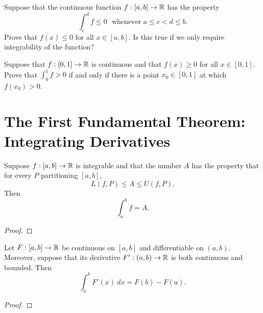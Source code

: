 \documentclass[letterpaper, twoside, 12pt]{book}
\begin{document}
\begin{exercise}[5]
  Suppose that the continuous function \(f:[a,b]\to\mathbb R\) has the property
  \[
    \int_c^d f\leq 0
      \text{~~whenever~}
    a\leq c<d\leq b
  .\]
  Prove that \(f(x)\leq 0\) for all \(x\in[a,b]\). Is this true if we only
  require integrability of the function?
\end{exercise}
\begin{solution}

\end{solution}


\begin{exercise}[6]
  Suppose that \(f:[0,1]\to\mathbb R\) is continuous and that \(f(x)\geq 0\) for
  all \(x\in[0,1]\). Prove that \(\int_0^1 f>0\) if and only if there is a
  point \(x_0\in[0,1]\) at which \(f(x_0)>0\).
\end{exercise}
\begin{solution}

\end{solution}




\section{The First Fundamental Theorem: Integrating Derivatives}


\begin{lemma}[6.21]
  Suppose \(f:[a,b]\to\mathbb R\) is integrable and that the number \(A\) has
  the property that for every \(P\) partitioning \([a,b]\),
  \[
    L(f,P) \leq A \leq U(f,P)
  .\]
  Then
  \[
    \int_a^b f = A
  .\]
\end{lemma}
\begin{proof}

\end{proof}


\begin{theorem}
  Let \(F:[a,b]\to\mathbb R\) be continuous on \([a,b]\) and differentiable on
  \((a,b)\). Moreover, suppose that its derivative
  \(F':(a,b)\to\mathbb R\) is both continuous and bounded. Then
  \[
    \int_a^b F'(x)~dx
      =
    F(b)-F(a)
  .\]
\end{theorem}
\begin{proof}

\end{proof}
\end{document}
